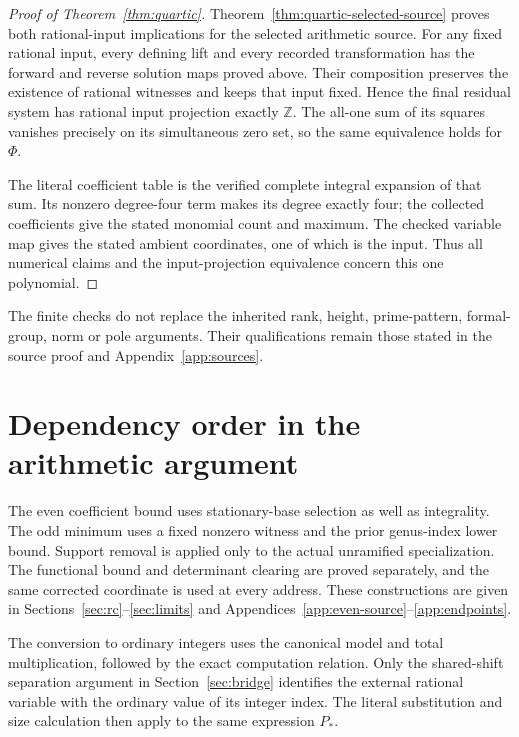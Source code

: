 \documentclass[11pt]{article}
\theoremstyle{definition}
\theoremstyle{remark}
\newcommand{\Z}{\mathbb Z}
\begin{document}
\begin{proof}[Proof of Theorem~\ref{thm:quartic}]
Theorem~\ref{thm:quartic-selected-source} proves both rational-input
implications for the selected arithmetic source. For any fixed rational
input, every defining lift and every recorded transformation has the
forward and reverse solution maps proved above. Their composition preserves
the existence of rational witnesses and keeps that input fixed. Hence the
final residual system has rational input projection exactly $\Z$.
The all-one sum of its squares vanishes precisely on its simultaneous
zero set, so the same equivalence holds for $\Phi$.

The literal coefficient table is the verified complete integral expansion
of that sum. Its nonzero degree-four term makes its degree exactly four;
the collected coefficients give the stated monomial count and maximum.
The checked variable map gives the stated ambient coordinates, one of
which is the input. Thus all numerical
claims and the input-projection equivalence concern this one polynomial.
\end{proof}

The finite checks do not replace the inherited rank, height, prime-pattern,
formal-group, norm or pole arguments. Their qualifications remain those
stated in the source proof and Appendix~\ref{app:sources}.

\appendix
\section{Dependency order in the arithmetic argument}\label{app:obligations}
The even coefficient bound uses stationary-base selection as well as
integrality. The odd minimum uses a fixed nonzero witness and the prior
genus-index lower bound. Support removal is applied only to the actual
unramified specialization. The functional bound and determinant clearing
are proved separately, and the same corrected coordinate is used at every
address. These constructions are given in Sections~\ref{sec:rc}--\ref{sec:limits}
and Appendices~\ref{app:even-source}--\ref{app:endpoints}.

The conversion to ordinary integers uses the canonical model and total
multiplication, followed by the exact computation relation. Only the
shared-shift separation argument in Section~\ref{sec:bridge} identifies
the external rational variable with the ordinary value of its integer
index. The literal substitution and size calculation then apply to the
same expression $P_*$.
\end{document}
